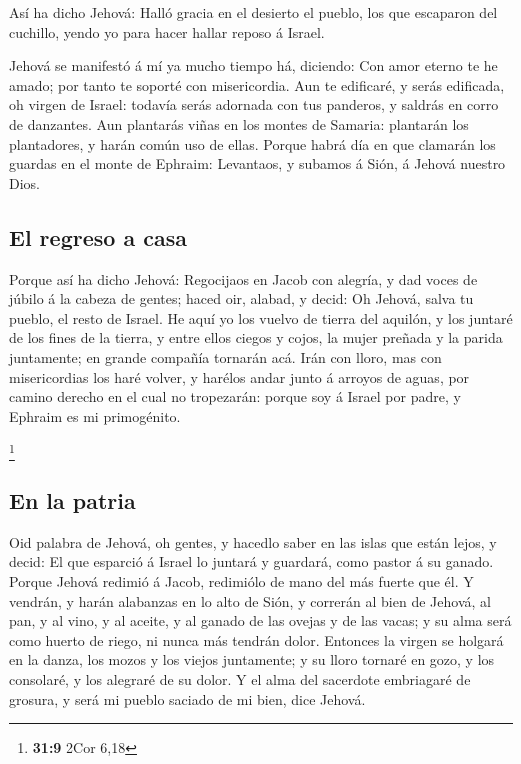  Así ha dicho Jehová: Halló gracia en el desierto el
pueblo, los que escaparon del cuchillo, yendo yo para hacer hallar
reposo á Israel.

 Jehová se manifestó á mí ya mucho tiempo há, diciendo:
Con amor eterno te he amado; por tanto te soporté con misericordia.
 Aun te edificaré, y serás edificada, oh virgen de Israel:
todavía serás adornada con tus panderos, y saldrás en corro de
danzantes.  Aun plantarás viñas en los montes de Samaria:
plantarán los plantadores, y harán común uso de ellas. 
Porque habrá día en que clamarán los guardas en el monte de Ephraim:
Levantaos, y subamos á Sión, á Jehová nuestro Dios.

\hypertarget{el-regreso-a-casa}{%
\subsection{El regreso a casa}\label{el-regreso-a-casa}}

 Porque así ha dicho Jehová: Regocijaos en Jacob con
alegría, y dad voces de júbilo á la cabeza de gentes; haced oir, alabad,
y decid: Oh Jehová, salva tu pueblo, el resto de Israel. 
He aquí yo los vuelvo de tierra del aquilón, y los juntaré de los fines
de la tierra, y entre ellos ciegos y cojos, la mujer preñada y la parida
juntamente; en grande compañía tornarán acá.  Irán con
lloro, mas con misericordias los haré volver, y harélos andar junto á
arroyos de aguas, por camino derecho en el cual no tropezarán: porque
soy á Israel por padre, y Ephraim es mi primogénito.

\footnote{\textbf{31:9} 2Cor 6,18}

\hypertarget{en-la-patria}{%
\subsection{En la patria}\label{en-la-patria}}

 Oid palabra de Jehová, oh gentes, y hacedlo saber en las
islas que están lejos, y decid: El que esparció á Israel lo juntará y
guardará, como pastor á su ganado.  Porque Jehová redimió
á Jacob, redimiólo de mano del más fuerte que él.  Y
vendrán, y harán alabanzas en lo alto de Sión, y correrán al bien de
Jehová, al pan, y al vino, y al aceite, y al ganado de las ovejas y de
las vacas; y su alma será como huerto de riego, ni nunca más tendrán
dolor.  Entonces la virgen se holgará en la danza, los
mozos y los viejos juntamente; y su lloro tornaré en gozo, y los
consolaré, y los alegraré de su dolor.  Y el alma del
sacerdote embriagaré de grosura, y será mi pueblo saciado de mi bien,
dice Jehová.


